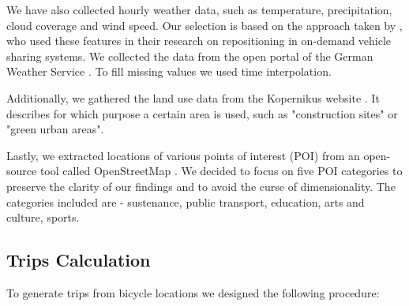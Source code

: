 We have also collected hourly weather data, such as temperature, precipitation, cloud coverage and wind speed. Our selection is based on the approach taken by , who used these features in their research on repositioning in on-demand vehicle sharing systems. We collected the data from the open portal of the German Weather Service . To fill missing values we used time interpolation.

Additionally, we gathered the land use data from the Kopernikus website . It describes for which purpose a certain area is used, such as "construction sites" or "green urban areas".

Lastly, we extracted locations of various points of interest (POI) from an open-source tool called  OpenStreetMap . We decided to focus on five POI categories to preserve the clarity of our findings and to avoid the curse of dimensionality. The categories included are - sustenance, public transport, education, arts and culture, sports.

\subsection{Trips Calculation}
To generate trips from bicycle locations we designed the following procedure:

